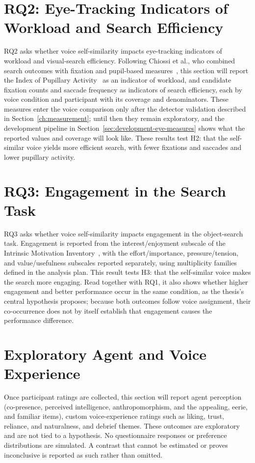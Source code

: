 \section{RQ2: Eye-Tracking Indicators of Workload and Search Efficiency}
RQ2 asks whether voice self-similarity impacts eye-tracking indicators of workload and visual-search efficiency. Following Chiossi et al., who combined search outcomes with fixation and pupil-based measures~\cite{chiossi2024searching}, this section will report the Index of Pupillary Activity~\cite{duchowski2018ipa} as an indicator of workload, and candidate fixation counts and saccade frequency as indicators of search efficiency, each by voice condition and participant with its coverage and denominators. These measures enter the voice comparison only after the detector validation described in Section~\ref{ch:measurement}; until then they remain exploratory, and the development pipeline in Section~\ref{sec:development-eye-measures} shows what the reported values and coverage will look like. These results test H2: that the self-similar voice yields more efficient search, with fewer fixations and saccades and lower pupillary activity.

\section{RQ3: Engagement in the Search Task}
RQ3 asks whether voice self-similarity impacts engagement in the object-search task. Engagement is reported from the interest/enjoyment subscale of the Intrinsic Motivation Inventory~\cite{mcauley1989imi}, with the effort/importance, pressure/tension, and value/usefulness subscales reported separately, using multiplicity families defined in the analysis plan. This result tests H3: that the self-similar voice makes the search more engaging. Read together with RQ1, it also shows whether higher engagement and better performance occur in the same condition, as the thesis's central hypothesis proposes; because both outcomes follow voice assignment, their co-occurrence does not by itself establish that engagement causes the performance difference.

\section{Exploratory Agent and Voice Experience}
Once participant ratings are collected, this section will report agent perception (co-presence, perceived intelligence, anthropomorphism, and the appealing, eerie, and familiar items), custom voice-experience ratings such as liking, trust, reliance, and naturalness, and debrief themes. These outcomes are exploratory and are not tied to a hypothesis. No questionnaire responses or preference distributions are simulated. A contrast that cannot be estimated or proves inconclusive is reported as such rather than omitted.

